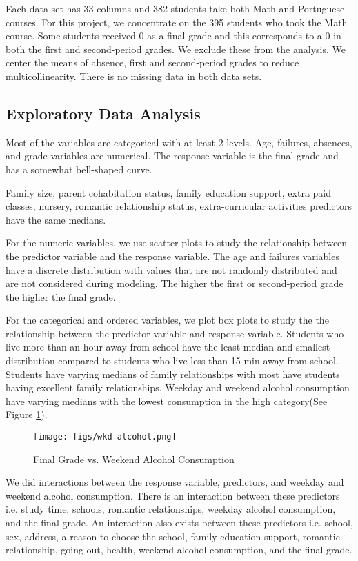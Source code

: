 \documentclass[11pt]{article}
\begin{document}
Each data set has 33 columns and 382 students take both Math and Portuguese courses. For this project, we concentrate on the 395 students who took the Math course. 
Some students received 0 as a final grade and this corresponds to a 0 in both the first and second-period grades. We exclude these from the analysis. We center the means of absence, first and second-period grades to reduce multicollinearity.
There is no missing data in both data sets.

\subsection{Exploratory Data Analysis}
Most of the variables are categorical with at least 2 levels. Age, failures, absences, and grade variables are numerical.
The response variable is the final grade and has a somewhat bell-shaped curve. 

Family size, parent cohabitation status, family education support, extra paid classes, nursery, romantic relationship status, extra-curricular activities predictors have the same medians. 

For the numeric variables, we use scatter plots to study the relationship between the predictor variable and the response variable. The age and failures variables have a discrete distribution with values that are not randomly distributed and are not considered during modeling.
The higher the first or second-period grade the higher the final grade.

For the categorical and ordered variables, we plot box plots to study the
the relationship between the predictor variable and response variable.
Students who live more than an hour away from school have the least median and smallest distribution compared to students who live less than 15 min away from school. 
Students have varying medians of family relationships with most have students having excellent family relationships.
Weekday and weekend alcohol consumption have varying medians with the lowest consumption in the high category(See Figure \ref{fig:fig1}).

\begin{figure}
	\centering
	\texttt{[image: figs/wkd-alcohol.png]}
	\caption{Final Grade vs. Weekend Alcohol Consumption}
	\label{fig:fig1}
\end{figure}

We did interactions between the response variable, predictors, and weekday and weekend alcohol consumption.
There is an interaction between these predictors i.e. study time, schools, romantic relationships, weekday alcohol consumption, and the final grade.
An interaction also exists between these predictors i.e. school, sex, address, a reason to choose the school, family education support, romantic relationship, going out, health, weekend alcohol consumption, and the final grade.
\end{document}
